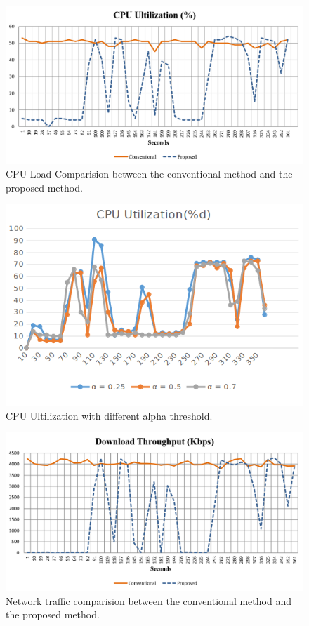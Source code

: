 \begin{figure}
\centering
\includegraphics[scale=0.7]{Figures/cpu.png}
\caption{CPU Load Comparision between the conventional method and the proposed method.}
\label{fig:cpu}
\end{figure}
\begin{figure}
\centering
\includegraphics[scale=0.7]{Figures/cpu_utilization.png}
\caption{CPU Ultilization with different alpha threshold.}
\label{fig:cpu_ultilization}
\end{figure}
\begin{figure}
\centering
\includegraphics[scale=0.7]{Figures/network.png}
\caption{Network traffic comparision between the conventional method and the proposed method.}
\label{fig:network}
\end{figure}
